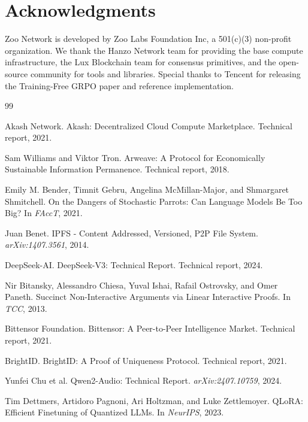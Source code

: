 \section*{Acknowledgments}


Zoo Network is developed by Zoo Labs Foundation Inc, a 501(c)(3) non-profit organization. We thank the Hanzo Network team for providing the base compute infrastructure, the Lux Blockchain team for consensus primitives, and the open-source community for tools and libraries. Special thanks to Tencent for releasing the Training-Free GRPO paper and reference implementation.


\begin{thebibliography}{99}

Akash Network.
\newblock Akash: Decentralized Cloud Compute Marketplace.
\newblock Technical report, 2021.

Sam Williams and Viktor Tron.
\newblock Arweave: A Protocol for Economically Sustainable Information Permanence.
\newblock Technical report, 2018.

Emily M. Bender, Timnit Gebru, Angelina McMillan-Major, and Shmargaret Shmitchell.
\newblock On the Dangers of Stochastic Parrots: Can Language Models Be Too Big?
\newblock In \textit{FAccT}, 2021.

Juan Benet.
\newblock IPFS - Content Addressed, Versioned, P2P File System.
\newblock \textit{arXiv:1407.3561}, 2014.

DeepSeek-AI.
\newblock DeepSeek-V3: Technical Report.
\newblock Technical report, 2024.

Nir Bitansky, Alessandro Chiesa, Yuval Ishai, Rafail Ostrovsky, and Omer Paneth.
\newblock Succinct Non-Interactive Arguments via Linear Interactive Proofs.
\newblock In \textit{TCC}, 2013.

Bittensor Foundation.
\newblock Bittensor: A Peer-to-Peer Intelligence Market.
\newblock Technical report, 2021.

BrightID.
\newblock BrightID: A Proof of Uniqueness Protocol.
\newblock Technical report, 2021.

Yunfei Chu et al.
\newblock Qwen2-Audio: Technical Report.
\newblock \textit{arXiv:2407.10759}, 2024.

Tim Dettmers, Artidoro Pagnoni, Ari Holtzman, and Luke Zettlemoyer.
\newblock QLoRA: Efficient Finetuning of Quantized LLMs.
\newblock In \textit{NeurIPS}, 2023.


\end{thebibliography}
